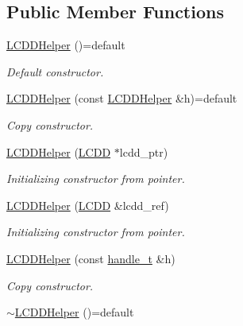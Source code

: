 \subsection*{Public Member Functions}
\begin{DoxyCompactItemize}
\item 
\hyperlink{class_d_d4hep_1_1_geometry_1_1_l_c_d_d_helper_af4232677be7028a073ac320fd77714e4}{L\+C\+D\+D\+Helper} ()=default
\begin{DoxyCompactList}\small\item\em Default constructor. \end{DoxyCompactList}\item 
\hyperlink{class_d_d4hep_1_1_geometry_1_1_l_c_d_d_helper_a35a63673b2c358741a64ff22e788361c}{L\+C\+D\+D\+Helper} (const \hyperlink{class_d_d4hep_1_1_geometry_1_1_l_c_d_d_helper}{L\+C\+D\+D\+Helper} \&h)=default
\begin{DoxyCompactList}\small\item\em Copy constructor. \end{DoxyCompactList}\item 
\hyperlink{class_d_d4hep_1_1_geometry_1_1_l_c_d_d_helper_a7b67df64bd69db0925571a28a4bd71b5}{L\+C\+D\+D\+Helper} (\hyperlink{class_d_d4hep_1_1_geometry_1_1_l_c_d_d}{L\+C\+DD} $\ast$lcdd\+\_\+ptr)
\begin{DoxyCompactList}\small\item\em Initializing constructor from pointer. \end{DoxyCompactList}\item 
\hyperlink{class_d_d4hep_1_1_geometry_1_1_l_c_d_d_helper_a086987c0a25ab742409a82a6f1bce2ed}{L\+C\+D\+D\+Helper} (\hyperlink{class_d_d4hep_1_1_geometry_1_1_l_c_d_d}{L\+C\+DD} \&lcdd\+\_\+ref)
\begin{DoxyCompactList}\small\item\em Initializing constructor from pointer. \end{DoxyCompactList}\item 
\hyperlink{class_d_d4hep_1_1_geometry_1_1_l_c_d_d_helper_ae1ee4bd05ac79164b7fc6951b1830da6}{L\+C\+D\+D\+Helper} (const \hyperlink{class_d_d4hep_1_1_handle_a3d9df9d5b334e984b288ffbabcacb564}{handle\+\_\+t} \&h)
\begin{DoxyCompactList}\small\item\em Copy constructor. \end{DoxyCompactList}\item 
\hyperlink{class_d_d4hep_1_1_geometry_1_1_l_c_d_d_helper_ac069c77f675ded9fc82ca22871ed8d67}{$\sim$\+L\+C\+D\+D\+Helper} ()=default

\end{DoxyCompactItemize}

